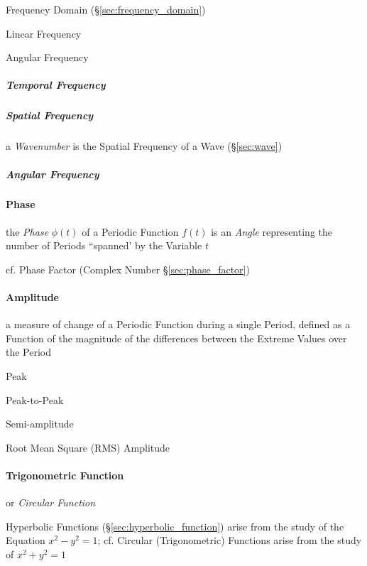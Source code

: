 \fist Frequency Domain (\S\ref{sec:frequency_domain})

Linear Frequency

Angular Frequency



\subparagraph{Temporal Frequency}\label{sec:temporal_frequency}\hfill

\subparagraph{Spatial Frequency}\label{sec:spatial_frequency}\hfill

a \emph{Wavenumber} is the Spatial Frequency of a Wave (\S\ref{sec:wave})



\subparagraph{Angular Frequency}\label{sec:angular_frequency}\hfill



\paragraph{Phase}\label{sec:phase}\hfill

the \emph{Phase} $\phi(t)$ of a Periodic Function $f(t)$ is an \emph{Angle}
representing the number of Periods ``spanned' by the Variable $t$

cf. Phase Factor (Complex Number \S\ref{sec:phase_factor})



\paragraph{Amplitude}\label{sec:amplitude}\hfill

a measure of change of a Periodic Function during a single Period, defined as a
Function of the magnitude of the differences between the Extreme Values over the
Period

Peak

Peak-to-Peak

Semi-amplitude

Root Mean Square (RMS) Amplitude



\paragraph{Trigonometric Function}\label{sec:trigonometric_function}\hfill

or \emph{Circular Function}

Hyperbolic Functions (\S\ref{sec:hyperbolic_function}) arise from the study of
the Equation $x^2 - y^2 = 1$; cf. Circular (Trigonometric) Functions arise from
the study of $x^2 + y^2 = 1$

